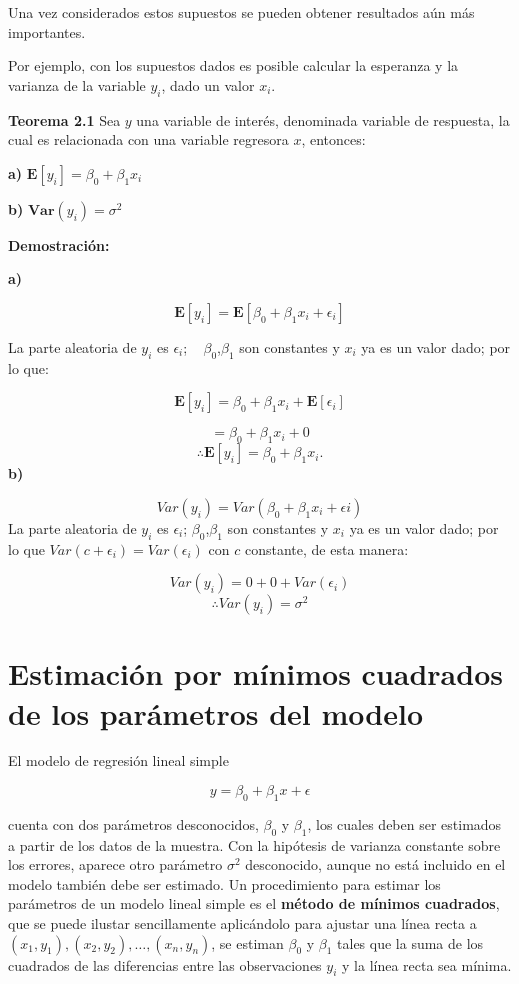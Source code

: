 \documentclass[
  a4paper,
  oneside,
  openany]{book}
\begin{document}
Una vez considerados estos supuestos se pueden obtener resultados aún más importantes.

Por ejemplo, con los supuestos dados es posible calcular la esperanza y la varianza de la variable \(y_{i}\), dado un valor \(x_{i}\).

\textbf{Teorema 2.1} Sea \(y\) una variable de interés, denominada variable de respuesta, la cual es relacionada con una variable regresora \(x\), entonces:

\textbf{a)} \(\mathbf{E}[y_{i}]=\beta_{0}+\beta_{1}x_{i}\)

\textbf{b)} \(\textbf{Var}(y_{i})=\sigma^2\)

\textbf{Demostración:}

\textbf{a)}

\[\mathbf{E}[y_{i}]=\mathbf{E}[\beta_{0}+\beta_{1}x_{i}+\epsilon_{i}]\]

La parte aleatoria de \(y_{i}\) es \(\epsilon_{i}\); ~ \(\beta_{0}\),\(\beta_{1}\) son constantes y \(x_{i}\) ya es un valor dado; por lo que:

\[\mathbf{E}[y_{i}]=\beta_{0}+\beta_{1}x_{i}+\mathbf{E}[\epsilon_{i}]\]

\[=\beta_{0}+\beta_{1}x_{i}+0\]
\[\therefore \mathbf{E}[y_{i}]=\beta_{0}+\beta_{1}x_{i}.\]
\textbf{b)}

\[Var(y_{i})= Var(\beta_{0}+\beta_{1}x_{i}+\epsilon{i})\]
La parte aleatoria de \(y_{i}\) es \(\epsilon_{i}\); \(\beta_{0}\),\(\beta_{1}\) son constantes y \(x_{i}\) ya es un valor dado; por lo que \(Var(c+\epsilon_{i})=Var(\epsilon_{i})\) con \(c\) constante, de esta manera:

\[Var(y_{i})=0+0+Var(\epsilon_{i})\]
\[\therefore Var(y_{i})=\sigma^2\]

\hypertarget{estimaciuxf3n-por-muxednimos-cuadrados-de-los-paruxe1metros-del-modelo}{%
\section{Estimación por mínimos cuadrados de los parámetros del modelo}\label{estimaciuxf3n-por-muxednimos-cuadrados-de-los-paruxe1metros-del-modelo}}

El modelo de regresión lineal simple

\[y=\beta_{0}+\beta_{1}x+\epsilon\]

cuenta con dos parámetros desconocidos, \(\beta_{0}\) y \(\beta_{1}\), los cuales deben ser estimados a partir de los datos de la muestra. Con la hipótesis de varianza constante sobre los errores, aparece otro parámetro \(\sigma^2\) desconocido, aunque no está incluido en el modelo también debe ser estimado.
Un procedimiento para estimar los parámetros de un modelo lineal simple es el \textbf{método de mínimos cuadrados}, que se puede ilustar sencillamente aplicándolo para ajustar una línea recta a \((x_{1},y_{1}),(x_{2},y_{2}),\ldots,(x_{n},y_{n})\), se estiman \(\beta_{0}\) y \(\beta_{1}\) tales que la suma de los cuadrados de las diferencias entre las observaciones \(y_{i}\) y la línea recta sea mínima.
\end{document}
